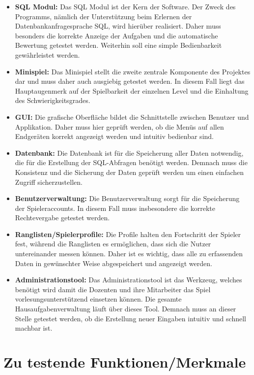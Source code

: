 \begin{itemize}
\item \textbf{SQL Modul: }Das SQL Modul ist der Kern der Software. Der Zweck des Programms, nämlich der Unterstützung beim Erlernen der Datenbankanfragesprache SQL, wird hierüber realisiert. Daher muss besonders die korrekte Anzeige der Aufgaben und die automatische Bewertung getestet werden. Weiterhin soll eine simple Bedienbarkeit gewährleistet werden.
\item \textbf{Minispiel: }Das Minispiel stellt die zweite zentrale Komponente des Projektes dar und muss daher auch ausgiebig getestet werden. In diesem Fall liegt das Hauptaugenmerk auf der Spielbarkeit der einzelnen Level und die Einhaltung des Schwierigkeitsgrades.
\item \textbf{GUI: }Die grafische Oberfläche bildet die Schnittstelle zwischen Benutzer und Applikation. Daher muss hier geprüft werden, ob die Menüs auf allen Endgeräten korrekt angezeigt werden und intuitiv bedienbar sind.
\item \textbf{Datenbank: }Die Datenbank ist für die Speicherung aller Daten notwendig, die für die Erstellung der SQL-Abfragen benötigt werden. Demnach muss die Konsistenz und die Sicherung der Daten geprüft werden um einen einfachen Zugriff sicherzustellen.
\item \textbf{Benutzerverwaltung: }Die Benutzerverwaltung sorgt für die Speicherung der Spieleraccounts. In diesem Fall muss insbesondere die korrekte Rechtevergabe getestet werden.
\item \textbf{Ranglisten/Spielerprofile: }Die Profile halten den Fortschritt der Spieler fest, während die Ranglisten es ermöglichen, dass sich die Nutzer untereinander messen können. Daher ist es wichtig, dass alle zu erfassenden Daten in gewünschter Weise abgespeichert und angezeigt werden.
\item \textbf{Administrationstool: }Das Administrationstool ist das Werkzeug, welches benötigt wird damit die Dozenten und ihre Mitarbeiter das Spiel vorlesungsunterstützend einsetzen können. Die gesamte Hausaufgabenverwaltung läuft über dieses Tool. Demnach muss an dieser Stelle getestet werden, ob die Erstellung neuer Eingaben intuitiv und schnell machbar ist.
\end{itemize}

\section{Zu testende Funktionen/Merkmale}

